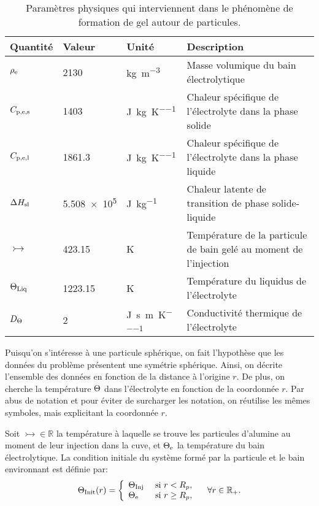 \begin{table}
  \begin{center}
    \caption{Paramètres physiques qui interviennent dans le
      phénomène de formation de gel autour de particules.}
    \label{tab:freeze-physical-parameters}
    \begin{tabularx}{\textwidth}{@{}lllX@{}}
      \toprule
      Quantité              & Valeur       & Unité                                       & Description \\
      \midrule
      $\rho_\mathrm{e}$ & \num{2130}    & \si{\kg\per\cubic\meter}                    & Masse volumique du bain électrolytique \\
      $C_{\mathrm{p,e,s}}$     & \num{1403}    & \si{\joule\per\kilo\gram\per\kelvin}        & Chaleur spécifique de l'électrolyte dans la phase solide \\
      $C_{\mathrm{p,e,l}}$     & \num{1861.3}  & \si{\joule\per\kilo\gram\per\kelvin}        & Chaleur spécifique de l'électrolyte dans la phase liquide \\
      $\Delta H_\mathrm{sl}$     & \num{5.508e5} & \si{\joule\per\kilo\gram}                   & Chaleur latente de transition de phase solide-liquide \\
      $\tinj$               & \num{423.15}  & \si{\kelvin}                                & Température de la particule de bain gelé au moment de l'injection \\
      $\Theta_\text{Liq}$               & \num{1223.15}  & \si{\kelvin}                                & Température du liquidus de l'électrolyte \\
      $D_\Theta$   & \num{2}     & \si{\joule\per\second\per\meter\per\kelvin} & Conductivité thermique de l'électrolyte \\
      \bottomrule
    \end{tabularx}
\end{center}
\end{table}

Puisqu'on s'intéresse à une particule sphérique, on fait l'hypothèse
que les données du problème présentent une symétrie sphérique. Ainsi,
on décrite l'ensemble des données en fonction de la distance à
l'origine $r$. De plus, on cherche la température $\Theta$ dans
l'électrolyte en fonction de la coordonnée $r$. Par abus de notation
et pour éviter de surcharger les notation, on réutilise les mêmes
symboles, mais explicitant la coordonnée $r$.

Soit $\tinj\in\mathbb R$ la température à laquelle se trouve les
particules d'alumine au moment de leur injection dans la cuve, et
$\Theta_\mathrm{e}$ la température du bain électrolytique. La condition
initiale du système formé par la particule et le bain environnant est
définie par:
\begin{equation}
  \Theta_\text{Init}(r) = \left\{
  \begin{array}{ll}
    \Theta_\text{Inj} & \text{ si } r < R_p,\\
    \Theta_\mathrm{e} & \text{ si } r \geq R_p,\\
  \end{array}
  \right.\quad \forall r\in \mathbb R_+ .\label{eq:initial-temperature}
\end{equation}

